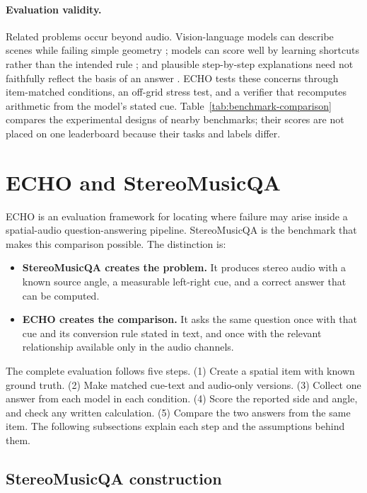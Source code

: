 \documentclass{article}
\providecommand{\tightlist}{%
  \setlength{\itemsep}{0pt}\setlength{\parskip}{0pt}}
\begin{document}
\paragraph{Evaluation validity.}
Related problems occur beyond audio. Vision-language models can describe scenes while failing simple geometry \citep{rahmanzadehgervi2024blind}; models can score well by learning shortcuts rather than the intended rule \citep{geirhos2020shortcut}; and plausible step-by-step explanations need not faithfully reflect the basis of an answer \citep{turpin2023unfaithful}. ECHO tests these concerns through item-matched conditions, an off-grid stress test, and a verifier that recomputes arithmetic from the model's stated cue. Table~\ref{tab:benchmark-comparison} compares the experimental designs of nearby benchmarks; their scores are not placed on one leaderboard because their tasks and labels differ.

\section{ECHO and StereoMusicQA}
\label{sec:methods}

ECHO is an evaluation framework for locating where failure may arise inside a spatial-audio question-answering pipeline. StereoMusicQA is the benchmark that makes this comparison possible. The distinction is:
\begin{itemize}
\tightlist
\item
    \textbf{StereoMusicQA creates the problem.} It produces stereo audio with a known source angle, a measurable left-right cue, and a correct answer that can be computed.
\item
    \textbf{ECHO creates the comparison.} It asks the same question once with that cue and its conversion rule stated in text, and once with the relevant relationship available only in the audio channels.
\end{itemize}

The complete evaluation follows five steps. (1) Create a spatial item with known ground truth. (2) Make matched cue-text and audio-only versions. (3) Collect one answer from each model in each condition. (4) Score the reported side and angle, and check any written calculation. (5) Compare the two answers from the same item. The following subsections explain each step and the assumptions behind them.

\subsection{StereoMusicQA construction}
\end{document}
